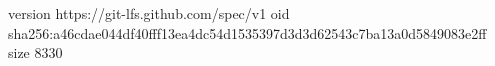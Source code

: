 version https://git-lfs.github.com/spec/v1
oid sha256:a46cdae044df40fff13ea4dc54d1535397d3d3d62543c7ba13a0d5849083e2ff
size 8330

